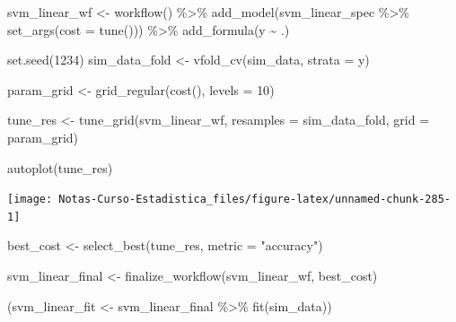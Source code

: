 \documentclass[
  12pt,
]{book}
\newenvironment{Shaded}{\begin{snugshade}}{\end{snugshade}}
\newcommand{\AttributeTok}[1]{\textcolor[rgb]{0.77,0.63,0.00}{#1}}
\newcommand{\DecValTok}[1]{\textcolor[rgb]{0.00,0.00,0.81}{#1}}
\newcommand{\FunctionTok}[1]{\textcolor[rgb]{0.00,0.00,0.00}{#1}}
\newcommand{\NormalTok}[1]{#1}
\newcommand{\OtherTok}[1]{\textcolor[rgb]{0.56,0.35,0.01}{#1}}
\newcommand{\SpecialCharTok}[1]{\textcolor[rgb]{0.00,0.00,0.00}{#1}}
\newcommand{\StringTok}[1]{\textcolor[rgb]{0.31,0.60,0.02}{#1}}
\theoremstyle{definition}
\theoremstyle{definition}
\theoremstyle{definition}
\theoremstyle{definition}
\theoremstyle{remark}
\begin{document}
\begin{Shaded}
\begin{Highlighting}[]
\NormalTok{svm\_linear\_wf }\OtherTok{\textless{}{-}} \FunctionTok{workflow}\NormalTok{() }\SpecialCharTok{\%\textgreater{}\%}
    \FunctionTok{add\_model}\NormalTok{(svm\_linear\_spec }\SpecialCharTok{\%\textgreater{}\%}
        \FunctionTok{set\_args}\NormalTok{(}\AttributeTok{cost =} \FunctionTok{tune}\NormalTok{())) }\SpecialCharTok{\%\textgreater{}\%}
    \FunctionTok{add\_formula}\NormalTok{(y }\SpecialCharTok{\textasciitilde{}}\NormalTok{ .)}

\FunctionTok{set.seed}\NormalTok{(}\DecValTok{1234}\NormalTok{)}
\NormalTok{sim\_data\_fold }\OtherTok{\textless{}{-}} \FunctionTok{vfold\_cv}\NormalTok{(sim\_data, }\AttributeTok{strata =}\NormalTok{ y)}

\NormalTok{param\_grid }\OtherTok{\textless{}{-}} \FunctionTok{grid\_regular}\NormalTok{(}\FunctionTok{cost}\NormalTok{(), }\AttributeTok{levels =} \DecValTok{10}\NormalTok{)}

\NormalTok{tune\_res }\OtherTok{\textless{}{-}} \FunctionTok{tune\_grid}\NormalTok{(svm\_linear\_wf, }\AttributeTok{resamples =}\NormalTok{ sim\_data\_fold,}
    \AttributeTok{grid =}\NormalTok{ param\_grid)}

\FunctionTok{autoplot}\NormalTok{(tune\_res)}
\end{Highlighting}
\end{Shaded}

\begin{center}\texttt{[image: Notas-Curso-Estadistica\_files/figure-latex/unnamed-chunk-285-1]} \end{center}

\begin{Shaded}
\begin{Highlighting}[]
\NormalTok{best\_cost }\OtherTok{\textless{}{-}} \FunctionTok{select\_best}\NormalTok{(tune\_res, }\AttributeTok{metric =} \StringTok{"accuracy"}\NormalTok{)}

\NormalTok{svm\_linear\_final }\OtherTok{\textless{}{-}} \FunctionTok{finalize\_workflow}\NormalTok{(svm\_linear\_wf,}
\NormalTok{    best\_cost)}

\NormalTok{(svm\_linear\_fit }\OtherTok{\textless{}{-}}\NormalTok{ svm\_linear\_final }\SpecialCharTok{\%\textgreater{}\%}
    \FunctionTok{fit}\NormalTok{(sim\_data))}
\end{Highlighting}
\end{Shaded}
\end{document}

